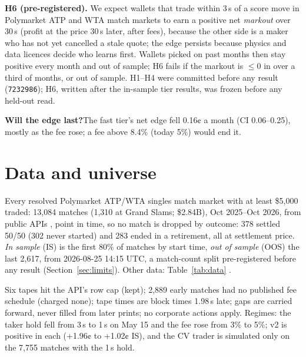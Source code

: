 \documentclass[11pt,letterpaper]{article}
\begin{document}
\begin{hypbox}
\textbf{H6 (pre-registered).} We expect wallets that trade within 3\,s of a score move in Polymarket ATP and WTA match
markets to earn a positive net \emph{markout} over 30\,s (profit at the price 30\,s later, after fees), because the
other side is a maker who has not yet cancelled a stale quote; the edge persists because physics and data licences
decide who learns first. Wallets picked on past months then stay positive every month and out of sample; H6 fails if
the markout is \(\leq 0\) in over a third of months, or out of sample. H1--H4 were committed before any result
(\texttt{7232986}); H6, written after the in-sample tier results, was frozen before any
held-out read.
\end{hypbox}

\textbf{Will the edge last?}\enspace The fast tier's net edge fell 0.16¢ a month (CI
0.06–0.25), mostly as the fee rose; a fee above 8.4\% (today 5\%) would end it.

\section{Data and universe}\label{sec:data}
Every resolved Polymarket ATP/WTA singles match market with at least \$5,000 traded:
13,084 matches (1,310 at Grand Slams; \$2.84B), Oct 2025--Oct 2026,
from public APIs \citep{pmapi}, point in time, so no match is dropped by outcome: 378
settled 50/50 (302 never started) and 283 ended in a retirement, all at
settlement price. \emph{In sample} (IS) is the first 80\% of matches by start time, \emph{out of sample} (OOS) the last
2,617, from 2026-08-25 14:15 UTC, a match-count split pre-registered before any result
(Section~\ref{sec:limits}). Other data: Table~\ref{tab:data}
\citep{huang2019,voeikov2020,sackmann2026}.

 Six tapes hit the API's row cap (kept); 2,889 early matches had no published fee
schedule (charged none); tape times are block times 1.98\,s late; gaps are carried forward, never
filled from later prints; no corporate actions apply. Regimes: the taker hold fell from 3\,s to 1\,s on
May 15 and the fee rose from 3\% to 5\%; v2 is positive in each (+1.96¢ to
+1.02¢ IS), and the CV trader is simulated only on the 7,755 matches with the 1\,s hold.

\end{document}
